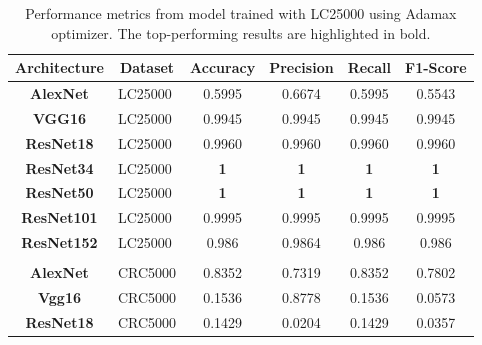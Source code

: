 \begin{table}[t!]
\centering

\caption{Performance metrics from model trained with \gls{LC25000} using Adamax optimizer. The top-performing results are highlighted in bold.}
\label{table_lc25000_adammax}

\begin{tabular}{|c|l|c|c|c|c|}
\hline
\textbf{Architecture} & \multicolumn{1}{c|}{\textbf{Dataset}}    & \textbf{Accuracy} & \textbf{Precision} & \textbf{Recall} & \textbf{F1-Score} \\ \hline
\textbf{AlexNet}      & LC25000                                  & 0.5995       & 0.6674             & 0.5995          & 0.5543            \\ \hline
\textbf{VGG16}        & LC25000                                  & 0.9945       & 0.9945             & 0.9945          & 0.9945            \\ \hline
\textbf{ResNet18}     & LC25000                                  & 0.9960       & 0.9960             & 0.9960          & 0.9960            \\ \hline
\textbf{ResNet34}     & LC25000                                  & \textbf{1}            & \textbf{1}                  & \textbf{1}               & \textbf{1}                 \\ \hline
\textbf{ResNet50}     & LC25000                                  & \textbf{1}            & \textbf{1}                  & \textbf{1}               & \textbf{1}                 \\ \hline
\textbf{ResNet101}    & LC25000                                  & 0.9995       & 0.9995             & 0.9995          & 0.9995            \\ \hline
\textbf{ResNet152}    & LC25000                                  & 0.986        & 0.9864             & 0.986           & 0.986             \\ \hline
\multicolumn{1}{|l|}{} &                                       & \multicolumn{1}{l|}{} & \multicolumn{1}{l|}{} & \multicolumn{1}{l|}{} & \multicolumn{1}{l|}{} \\ \hline
\textbf{AlexNet}      & CRC5000                                  & 0.8352        & 0.7319              & 0.8352           & 0.7802             \\ \hline
\textbf{Vgg16}      & CRC5000                                    & 0.1536        & 0.8778              & 0.1536           & 0.0573             \\ \hline
\textbf{ResNet18}    & CRC5000                                   & 0.1429        & 0.0204              & 0.1429           & 0.0357             \\ \hline

\end{tabular}
\end{table}
